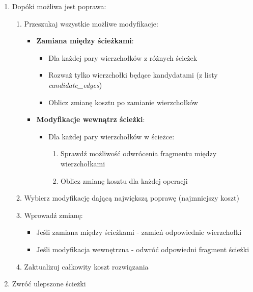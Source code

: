 \documentclass[11pt]{article}
\begin{document}
\begin{enumerate}
\item Dopóki możliwa jest poprawa:
\begin{enumerate}
\item Przeszukaj wszystkie możliwe modyfikacje:
\begin{itemize}
    \item \textbf{Zamiana między ścieżkami}:
    \begin{itemize}
        \item Dla każdej pary wierzchołków z różnych ścieżek
        \item Rozważ tylko wierzchołki będące kandydatami (z listy \textit{candidate\_edges})
        \item Oblicz zmianę kosztu po zamianie wierzchołków
    \end{itemize}

  \item \textbf{Modyfikacje wewnątrz ścieżki}:
      \begin{itemize}
        \item Dla każdej pary wierzchołków w ścieżce:
        \begin{enumerate}
          \item Sprawdź możliwość odwrócenia fragmentu między wierzchołkami
          \item Oblicz zmianę kosztu dla każdej operacji
        \end{enumerate}
      \end{itemize}
    \end{itemize}

\item Wybierz modyfikację dającą największą poprawę (najmniejszy koszt)

\item Wprowadź zmianę:
\begin{itemize}
  \item Jeśli zamiana między ścieżkami - zamień odpowiednie wierzchołki
  \item Jeśli modyfikacja wewnętrzna - odwróć odpowiedni fragment ścieżki
\end{itemize}

\item Zaktualizuj całkowity koszt rozwiązania
\end{enumerate}

\item Zwróć ulepszone ścieżki
\end{enumerate}
\end{document}
